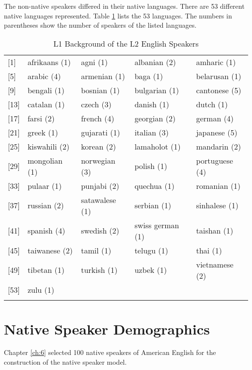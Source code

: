The non-native speakers differed in their native languages. There are 53 different native languages represented. Table \ref{table:sd1} lists the 53 languages. The numbers in parentheses show the number of speakers of the listed languages.
\figSpace
\begin{longtable}{lllll}
\caption{L1 Background of the L2 English Speakers}\\
\hline
{[}1{]}  & afrikaans (1) & agni (1)      & albanian (2)           & amharic (1)    \\
{[}5{]}  & arabic (4)    & armenian (1)   & baga (1)               & belarusan (1)  \\
{[}9{]}  & bengali (1)   & bosnian (1)    & bulgarian (1)          & cantonese (5)  \\
{[}13{]} & catalan (1)   & czech (3)      & danish (1)             & dutch (1)      \\
{[}17{]} & farsi (2)     & french  (4)    & georgian (2)           & german (4)     \\
{[}21{]} & greek (1)     & gujarati (1)   & italian (3)            & japanese (5)   \\
{[}25{]} & kiswahili (2) & korean (2)     & lamaholot (1)          & mandarin (2)   \\
{[}29{]} & mongolian (1) & norwegian  (3) & polish (1)             & portuguese (4) \\
{[}33{]} & pulaar (1)    & punjabi (2)    & quechua (1)            & romanian (1)   \\
{[}37{]} & russian (2)   & satawalese (1) & serbian (1)            & sinhalese (1)  \\
{[}41{]} & spanish (4)   & swedish (2)    & swiss german (1) &taishan (1)            \\
{[}45{]} & taiwanese (2) & tamil (1)      & telugu (1)             & thai (1)      \\
{[}49{]} & tibetan (1)   & turkish (1)    & uzbek  (1)             & vietnamese (2) \\
{[}53{]} & zulu (1)      &            &                    &       \\
\hline    
\label{table:sd1}
\end{longtable}
\figSpace
\section{Native Speaker Demographics}
\label{dem:native}

Chapter \ref{ch:6} selected 100 native speakers of American English for the construction of the native speaker model. 

